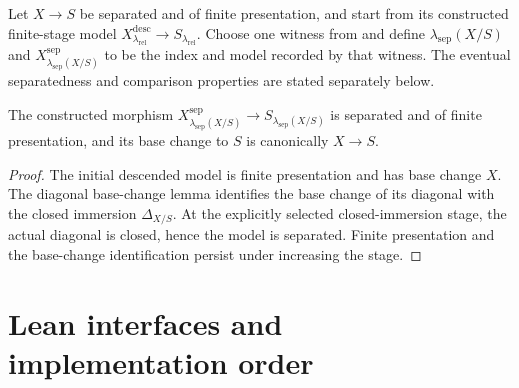 \begin{definition}
  \label{def:nagata-separated-descent-stage}

  Let $X\to S$ be separated and of finite presentation, and start from its
  constructed finite-stage model
  $X^{\mathrm{desc}}_{\lambda_{\mathrm{rel}}}\to
  S_{\lambda_{\mathrm{rel}}}$.  Choose one witness from
   and define
  $\lambda_{\mathrm{sep}}(X/S)$ and
  $X^{\mathrm{sep}}_{\lambda_{\mathrm{sep}}(X/S)}$ to be the index and model
  recorded by that witness.  The eventual separatedness and comparison
  properties are stated separately below.
\end{definition}

\begin{lemma}
  \label{lemma:nagata-separated-eventually}

  The constructed morphism
  $X^{\mathrm{sep}}_{\lambda_{\mathrm{sep}}(X/S)}
  \to S_{\lambda_{\mathrm{sep}}(X/S)}$ is
  separated and of finite presentation, and its base change to $S$ is
  canonically $X\to S$.
\end{lemma}

\begin{proof}
  The initial descended model is finite presentation and has base change $X$.
  The diagonal base-change lemma identifies the base change of its diagonal
  with the closed immersion $\Delta_{X/S}$.  At the explicitly selected
  closed-immersion stage, the actual diagonal is closed, hence the model is
  separated.  Finite presentation and the base-change identification persist
  under increasing the stage.
\end{proof}


\section{Lean interfaces and implementation order}

